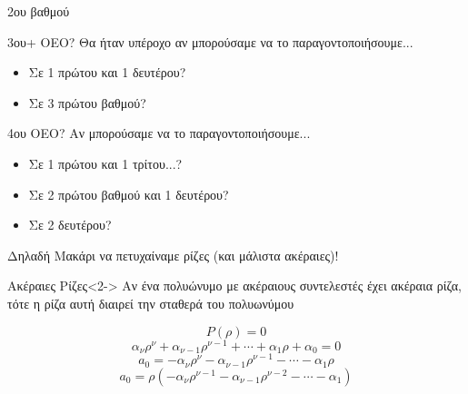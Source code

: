 \documentclass{presentation}
\begin{document}
\begin{frame}{2ου βαθμού}
  \centering
\end{frame}

\begin{frame}{3ου+ ΟΕΟ?}
  Θα ήταν υπέροχο αν μπορούσαμε να το παραγοντοποιήσουμε...
  \begin{itemize}
    \item<1-> Σε 1 πρώτου και 1 δευτέρου?
    \item<2-> Σε 3 πρώτου βαθμού?
  \end{itemize}
\end{frame}

\begin{frame}{4ου ΟΕΟ?}
  Αν μπορούσαμε να το παραγοντοποιήσουμε...
  \begin{itemize}
    \item<1-> Σε 1 πρώτου και 1 τρίτου...?
    \item<2-> Σε 2 πρώτου βαθμού και 1 δευτέρου?
    \item<3-> Σε 2 δευτέρου?
  \end{itemize}
\end{frame}

\begin{frame}{Δηλαδή}
  Μακάρι να πετυχαίναμε ρίζες (και μάλιστα ακέραιες)!
  \begin{block}{Ακέραιες Ρίζες}<2->
    Αν ένα πολυώνυμο με ακέραιους συντελεστές έχει ακέραια ρίζα, τότε η ρίζα αυτή διαιρεί την σταθερά του πολυωνύμου
  \end{block}
    {$$P(ρ)=0$$ $$α_νρ^ν+α_{ν-1}ρ^{ν-1}+\cdots+α_1ρ+α_0=0$$ $$a_0=-α_νρ^ν-α_{ν-1}ρ^{ν-1}-\cdots-α_1ρ $$ $$a_0=ρ(-α_νρ^{ν-1}-α_{ν-1}ρ^{ν-2}-\cdots-α_1)$$}

\end{frame}
\end{document}
